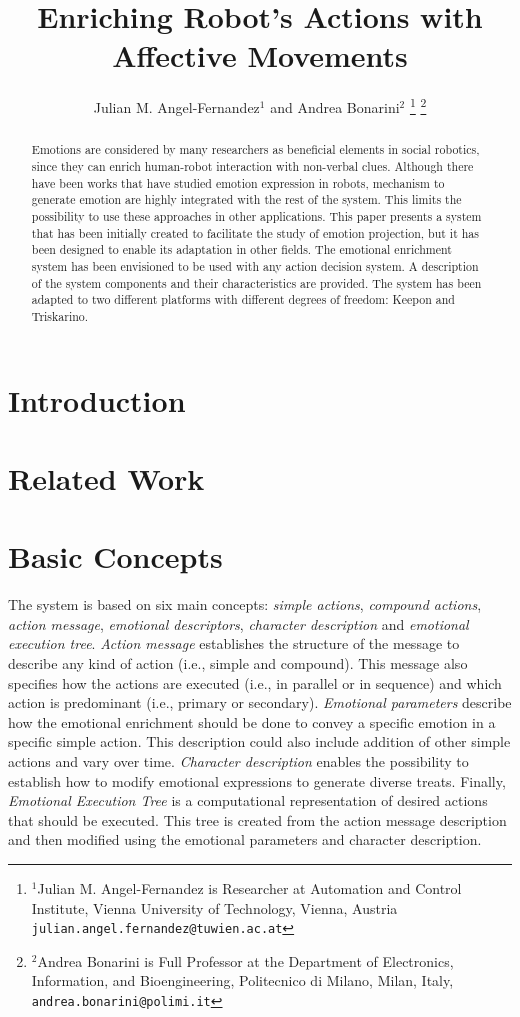 \documentclass[letterpaper, 10 pt, conference]{ieeeconf}  %
\title{\LARGE \bf
Enriching Robot's Actions with Affective Movements
}
\author{Julian M. Angel-Fernandez$^{1}$ and Andrea Bonarini$^{2}$%
\thanks{$^{1}$Julian M. Angel-Fernandez is Researcher at Automation and Control Institute, Vienna University of Technology, Vienna, Austria
        {\tt\small julian.angel.fernandez@tuwien.ac.at}}%
\thanks{$^{2}$Andrea Bonarini is Full Professor at the Department of Electronics, Information, and Bioengineering, Politecnico di Milano, Milan, Italy,
        {\tt\small andrea.bonarini@polimi.it}}%
}
\begin{document}
\maketitle
\thispagestyle{empty}
\pagestyle{empty}


\begin{abstract}
Emotions are considered by many researchers as beneficial elements in social robotics, since they can enrich human-robot interaction with non-verbal clues. Although there have been works that have studied emotion expression in robots, mechanism to generate emotion are highly integrated with the rest of the system. This limits the possibility to use these approaches in other applications. This paper presents a system that has been initially created to facilitate the study of emotion projection, but it has been designed to enable its adaptation in other fields. The emotional enrichment system has been envisioned to be used with any action decision system. A description of the system components and their characteristics are provided. The system has been adapted to two different platforms with different degrees of freedom: Keepon and Triskarino. 
\end{abstract}

\section{Introduction}

\section{Related Work}

\section{Basic Concepts}
\label{sec:concepts}
The system is based on six main concepts: \textit{simple actions}, \textit{compound actions}, \textit{action message}, \textit{emotional descriptors}, \textit{character description} and \textit{emotional execution tree}. \textit{Action message} establishes the structure of the message to describe any kind of action (i.e., simple and compound). This message also specifies how the actions are executed (i.e., in parallel or in sequence) and which action is predominant (i.e., primary or secondary). \textit{Emotional parameters} describe how the emotional enrichment should be done to convey a specific emotion in a specific simple action. This description could also include addition of other simple actions and vary over time. \textit{Character description} enables the possibility to establish how to modify emotional expressions to generate diverse treats. Finally, \textit{Emotional Execution Tree} is a computational representation of desired actions that should be executed. This tree is created from the action message description and then modified using the emotional parameters and character description.  
\end{document}
